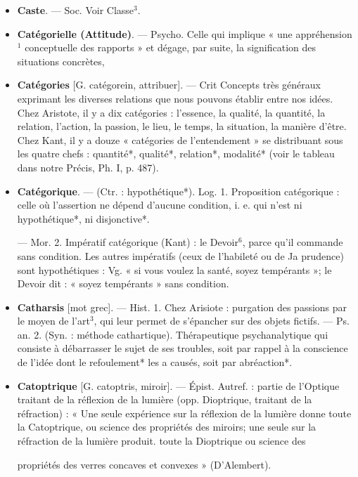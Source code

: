 \begin{itemize}[leftmargin=1cm, label=, itemsep=11pt]
\item {\bf Caste}. — Soc. Voir Classe$^3$.

\item {\bf Catégorielle (Attitude)}. — Psycho.
Celle qui implique « une appréhension$^1$ conceptuelle des rapports » et
dégage, par suite, la signification
des situations concrètes,

\item {\bf Catégories} [G. catégorein, attribuer].
— Crit Concepts très généraux
exprimant les diverses relations que
nous pouvons établir entre nos idées.
Chez Aristote, il y a dix catégories :
l'essence, la qualité, la quantité, la
relation, l’action, la passion, le lieu,
le temps, la situation, la manière
d’être. Chez Kant, il y a douze « catégories de l’entendement » se distribuant sous les quatre chefs : quantité*, qualité*, relation*, modalité*
(voir le tableau dans notre Précis,
Ph. I, p. 487).

\item {\bf Catégorique}. — (Ctr. : hypothétique*).
Log. 1. Proposition catégorique :
celle où l’assertion ne dépend d’aucune condition, i. e. qui n’est ni
hypothétique*, ni disjonctive*.

— Mor. 2. Impératif catégorique
(Kant) : le Devoir$^6$, parce qu'il
commande sans condition. Les
autres impératifs (ceux de l’habileté
ou de Ja prudence) sont hypothétiques : Vg. « si vous voulez la santé,
soyez tempérants »; le Devoir dit :
« soyez tempérants » sans condition.

\item {\bf Catharsis} [mot grec]. — Hist. 1. Chez
Arisiote : purgation des passions par
le moyen de l’art$^3$, qui leur permet
de s’épancher sur des objets fictifs.
— Ps. an. 2. (Syn. : méthode cathartique). Thérapeutique psychanalytique qui consiste à débarrasser le
sujet de ses troubles, soit par rappel
à la conscience de l’idée dont le
refoulement* les a causés, soit par
abréaction*.

\item {\bf Catoptrique} [G. catoptris, miroir]. —
Épist. Autref. : partie de l'Optique
traitant de la réflexion de la lumière
(opp. Dioptrique, traitant de la
réfraction) : « Une seule expérience
sur la réflexion de la lumière donne
toute la Catoptrique, ou science des
propriétés des miroirs; une seule sur
la réfraction de la lumière produit.
toute la Dioptrique ou science des

propriétés des verres concaves et
convexes » (D’Alembert).


\end{itemize}
